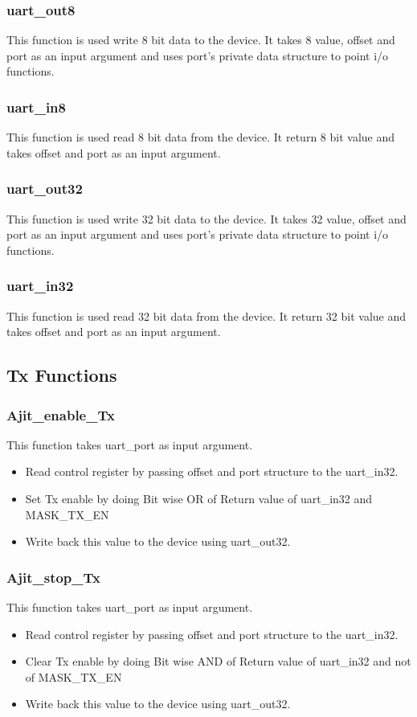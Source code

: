 \documentclass[12pt,a4paper]{article}
\begin{document}
\subsubsection{uart\_out8}
This function is used write 8 bit data to the device.
It takes 8 value, offset and port as an input argument and uses port's private data structure to point i/o  functions.
\subsubsection{uart\_in8}
This function is used read 8 bit data from the device.
It return  8 bit  value and takes offset and port as an input argument.
\subsubsection{uart\_out32}
This function is used write 32 bit data to the device.
It takes 32 value, offset and port as an input argument and uses port's private data structure to point i/o  functions.
\subsubsection{uart\_in32}
This function is used read 32 bit data from the device.
It return  32 bit  value and takes offset and port as an input argument.
\subsection{Tx Functions}
\subsubsection{Ajit\_enable\_Tx}
This function takes uart\_port as input argument.
\begin{itemize}
\item Read control register by passing offset and port structure to the uart\_in32. 
\item Set Tx enable by doing Bit wise OR of Return value of uart\_in32 and MASK\_TX\_EN 
\item Write back this value to the device using uart\_out32.  
\end{itemize}
\subsubsection{Ajit\_stop\_Tx}
This function takes uart\_port as input argument.
\begin{itemize}
\item Read control register by passing offset and port structure to the uart\_in32. 
\item Clear Tx enable by doing Bit wise AND of Return value of uart\_in32 and not of MASK\_TX\_EN 
\item Write back this value to the device using uart\_out32.  
\end{itemize}
\end{document}
